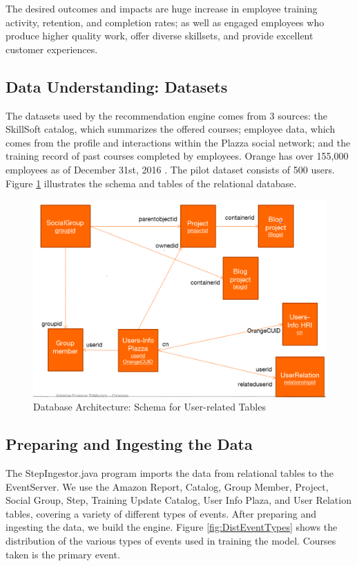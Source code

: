 \documentclass[12pt,journal]{IEEEtran}
\begin{document}
The desired outcomes and impacts are huge increase in employee training activity, retention, and completion rates; as well as engaged employees who produce higher quality work, offer diverse skillsets, and provide excellent customer experiences.

\subsection{Data Understanding: Datasets}

The datasets used by the recommendation engine comes from 3 sources: the SkillSoft catalog, which summarizes the offered courses; employee data, which comes from the profile and interactions within the Plazza social network; and the training record of past courses completed by employees.  Orange has over 155,000 employees as of December 31st, 2016  \cite{orangeSA}.  The pilot dataset consists of 500 users.  Figure \ref{fig:schema} illustrates the schema and tables of the relational database.

\begin{figure}[htbp]
\begin{center}
\includegraphics[width=1\columnwidth]{schema}
\end{center}
\caption{Database Architecture: Schema for User-related Tables}
\label{fig:schema}
\end{figure}

\subsection{Preparing and Ingesting the Data}

The StepIngestor.java program imports the data from relational tables to the EventServer.  We use the Amazon Report, Catalog, Group Member, Project, Social Group, Step, Training Update Catalog, User Info Plaza, and User Relation tables, covering a variety of different types of events.  After preparing and ingesting the data, we build the engine.  Figure \ref{fig:DistEventTypes} shows the distribution of the various types of events used in training the model.  Courses taken is the primary event.
\end{document}
